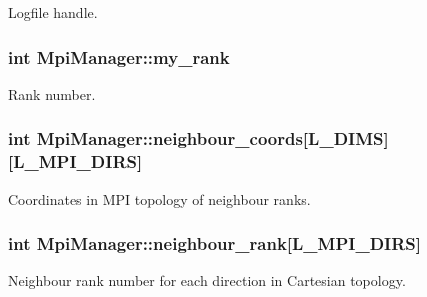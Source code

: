 Logfile handle. 

\subsubsection[{\texorpdfstring{my\+\_\+rank}{my_rank}}]{\setlength{\rightskip}{0pt plus 5cm}int Mpi\+Manager\+::my\+\_\+rank}\hypertarget{class_mpi_manager_a8329212abc23e5fa3e32e961b7823b5b}{}\label{class_mpi_manager_a8329212abc23e5fa3e32e961b7823b5b}


Rank number. 

\subsubsection[{\texorpdfstring{neighbour\+\_\+coords}{neighbour_coords}}]{\setlength{\rightskip}{0pt plus 5cm}int Mpi\+Manager\+::neighbour\+\_\+coords\mbox{[}{\bf L\+\_\+\+D\+I\+MS}\mbox{]}\mbox{[}{\bf L\+\_\+\+M\+P\+I\+\_\+\+D\+I\+RS}\mbox{]}}\hypertarget{class_mpi_manager_a5a7268347fcab916adc61bee47e9f626}{}\label{class_mpi_manager_a5a7268347fcab916adc61bee47e9f626}


Coordinates in M\+PI topology of neighbour ranks. 

\subsubsection[{\texorpdfstring{neighbour\+\_\+rank}{neighbour_rank}}]{\setlength{\rightskip}{0pt plus 5cm}int Mpi\+Manager\+::neighbour\+\_\+rank\mbox{[}{\bf L\+\_\+\+M\+P\+I\+\_\+\+D\+I\+RS}\mbox{]}}\hypertarget{class_mpi_manager_af2891954ff504c12ec6d5f845e906f28}{}\label{class_mpi_manager_af2891954ff504c12ec6d5f845e906f28}


Neighbour rank number for each direction in Cartesian topology. 

